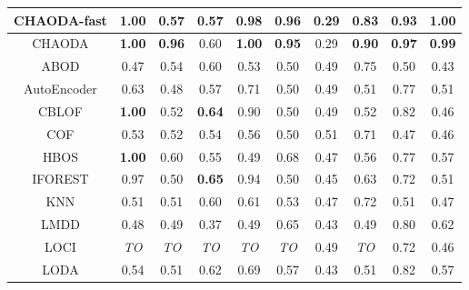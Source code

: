 \begin{table}[!t]
\begin{center}
\begin{small}
\begin{sc}
\begin{tabular}{|c|c|c|c|c|c|c|c|c|c|}
\hline
CHAODA-fast    & \textbf{1.00} &               0.57 &          0.57 &     \textbf{0.98} & \textbf{0.96} &          0.29 &   \textbf{0.83} &          0.93 & \textbf{1.00} \\
\hline
CHAODA         & \textbf{1.00} &      \textbf{0.96} &          0.60 &     \textbf{1.00} & \textbf{0.95} &          0.29 &   \textbf{0.90} & \textbf{0.97} & \textbf{0.99} \\
\hline
ABOD           &          0.47 &               0.54 &          0.60 &              0.53 &          0.50 &          0.49 &            0.75 &          0.50 &          0.43 \\
\hline
AutoEncoder    &          0.63 &               0.48 &          0.57 &              0.71 &          0.50 &          0.49 &            0.51 &          0.77 &          0.51 \\
\hline
CBLOF          & \textbf{1.00} &               0.52 & \textbf{0.64} &              0.90 &          0.50 &          0.49 &            0.52 &          0.82 &          0.46 \\
\hline
COF            &          0.53 &               0.52 &          0.54 &              0.56 &          0.50 &          0.51 &            0.71 &          0.47 &          0.46 \\
\hline
HBOS           & \textbf{1.00} &               0.60 &          0.55 &              0.49 &          0.68 &          0.47 &            0.56 &          0.77 &          0.57 \\
\hline
IFOREST        &          0.97 &               0.50 & \textbf{0.65} &              0.94 &          0.50 &          0.45 &            0.63 &          0.72 &          0.51 \\
\hline
KNN            &          0.51 &               0.51 &          0.60 &              0.61 &          0.53 &          0.47 &            0.72 &          0.51 &          0.47 \\
\hline
LMDD           &          0.48 &               0.49 &          0.37 &              0.49 &          0.65 &          0.43 &            0.49 &          0.80 &          0.62 \\
\hline
LOCI           &   \textit{TO} &        \textit{TO} &   \textit{TO} &       \textit{TO} &   \textit{TO} &          0.49 &     \textit{TO} &          0.72 &          0.46 \\
\hline
LODA           &          0.54 &               0.51 &          0.62 &              0.69 &          0.57 &          0.43 &            0.51 &          0.82 &          0.57 \\

\end{tabular}
\end{sc}
\end{small}
\end{center}
\end{table}
